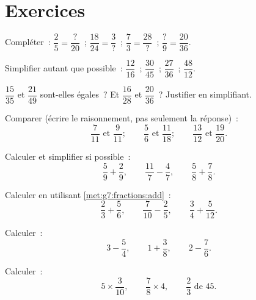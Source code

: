 \section{Exercices}

\begin{exercise}[$\star$]\label{exo:g7:fractions:1}
Compléter~: $\dfrac{2}{5} = \dfrac{?}{20}$~; \quad
$\dfrac{18}{24} = \dfrac{3}{?}$~; \quad
$\dfrac{7}{3} = \dfrac{28}{?}$~; \quad
$\dfrac{?}{9} = \dfrac{20}{36}$.
\end{exercise}

\begin{exercise}[$\star$]\label{exo:g7:fractions:2}
Simplifier autant que possible~:
$\dfrac{12}{16}$~; \quad $\dfrac{30}{45}$~; \quad $\dfrac{27}{36}$~;
\quad $\dfrac{48}{12}$.
\end{exercise}

\begin{exercise}[$\star$]\label{exo:g7:fractions:3}
$\dfrac{15}{35}$ et $\dfrac{21}{49}$ sont-elles égales~? Et
$\dfrac{16}{28}$ et $\dfrac{20}{36}$~? Justifier en simplifiant.
\end{exercise}

\begin{exercise}[$\star$]\label{exo:g7:fractions:4}
Comparer (écrire le raisonnement, pas seulement la réponse)~:
\[
\frac{7}{11} \text{ et } \frac{9}{11}; \qquad
\frac{5}{6} \text{ et } \frac{11}{18}; \qquad
\frac{13}{12} \text{ et } \frac{19}{20}.
\]
\end{exercise}

\begin{exercise}[$\star$]\label{exo:g7:fractions:5}
Calculer et simplifier si possible~:
\[
\frac{5}{9} + \frac{2}{9}, \qquad
\frac{11}{7} - \frac{4}{7}, \qquad
\frac{5}{8} + \frac{7}{8} .
\]
\end{exercise}

\begin{exercise}[$\star$]\label{exo:g7:fractions:6}
Calculer en utilisant \cref{met:g7:fractions:add}~:
\[
\frac{2}{3} + \frac{5}{6}, \qquad
\frac{7}{10} - \frac{2}{5}, \qquad
\frac{3}{4} + \frac{5}{12} .
\]
\end{exercise}

\begin{exercise}[$\star$]\label{exo:g7:fractions:7}
Calculer~:
\[
3 - \frac{5}{4}, \qquad
1 + \frac{3}{8}, \qquad
2 - \frac{7}{6} .
\]
\end{exercise}

\begin{exercise}[$\star$]\label{exo:g7:fractions:8}
Calculer~:
\[
5 \times \frac{3}{10}, \qquad
\frac{7}{8} \times 4, \qquad
\frac{2}{3} \text{ de } 45 .
\]
\end{exercise}

